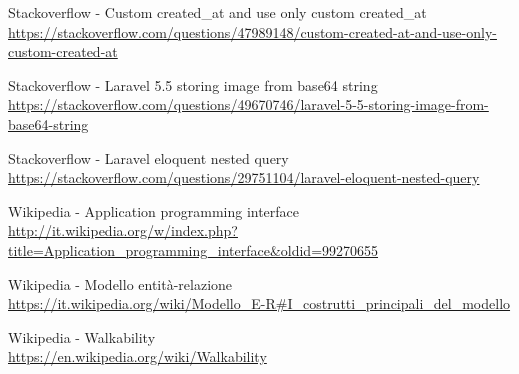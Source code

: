 \documentclass[a4paper,12pt]{book}
\begin{document}
\begin{thebibliography}{100}
		 Stackoverflow - Custom created\_at and use only custom created\_at \\
		\url{https://stackoverflow.com/questions/47989148/custom-created-at-and-use-only-custom-created-at}
		
		 Stackoverflow - Laravel 5.5 storing image from base64 string \\
		\url{https://stackoverflow.com/questions/49670746/laravel-5-5-storing-image-from-base64-string}
		
		 Stackoverflow - Laravel eloquent nested query \\
		\url{https://stackoverflow.com/questions/29751104/laravel-eloquent-nested-query}
	
		 Wikipedia - Application programming interface \\ \url{http://it.wikipedia.org/w/index.php?title=Application_programming_interface&oldid=99270655}
	
		 Wikipedia - Modello entità-relazione \\
		\url{https://it.wikipedia.org/wiki/Modello_E-R#I_costrutti_principali_del_modello}
		
		 Wikipedia - Walkability \\
		\url{https://en.wikipedia.org/wiki/Walkability}
	\end{thebibliography}
	
\end{document}
